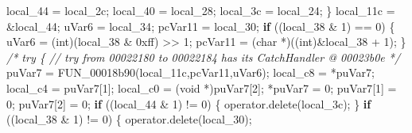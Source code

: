 \documentclass[
]{article}
\newenvironment{Shaded}{}{}
\newcommand{\BaseNTok}[1]{\textcolor[rgb]{0.25,0.63,0.44}{#1}}
\newcommand{\CommentTok}[1]{\textcolor[rgb]{0.38,0.63,0.69}{\textit{#1}}}
\newcommand{\ControlFlowTok}[1]{\textcolor[rgb]{0.00,0.44,0.13}{\textbf{#1}}}
\newcommand{\DataTypeTok}[1]{\textcolor[rgb]{0.56,0.13,0.00}{#1}}
\newcommand{\DecValTok}[1]{\textcolor[rgb]{0.25,0.63,0.44}{#1}}
\newcommand{\NormalTok}[1]{#1}
\newcommand{\OperatorTok}[1]{\textcolor[rgb]{0.40,0.40,0.40}{#1}}
\begin{document}
\begin{Shaded}
\begin{Highlighting}[]
\NormalTok{    local\_44 }\OperatorTok{=}\NormalTok{ local\_2c}\OperatorTok{;}
\NormalTok{    local\_40 }\OperatorTok{=}\NormalTok{ local\_28}\OperatorTok{;}
\NormalTok{    local\_3c }\OperatorTok{=}\NormalTok{ local\_24}\OperatorTok{;}
  \OperatorTok{\}}
\NormalTok{  local\_11c }\OperatorTok{=} \OperatorTok{\&}\NormalTok{local\_44}\OperatorTok{;}
\NormalTok{  uVar6 }\OperatorTok{=}\NormalTok{ local\_34}\OperatorTok{;}
\NormalTok{  pcVar11 }\OperatorTok{=}\NormalTok{ local\_30}\OperatorTok{;}
  \ControlFlowTok{if} \OperatorTok{((}\NormalTok{local\_38 }\OperatorTok{\&} \DecValTok{1}\OperatorTok{)} \OperatorTok{==} \DecValTok{0}\OperatorTok{)} \OperatorTok{\{}
\NormalTok{    uVar6 }\OperatorTok{=} \OperatorTok{(}\DataTypeTok{int}\OperatorTok{)(}\NormalTok{local\_38 }\OperatorTok{\&} \BaseNTok{0xff}\OperatorTok{)} \OperatorTok{\textgreater{}\textgreater{}} \DecValTok{1}\OperatorTok{;}
\NormalTok{    pcVar11 }\OperatorTok{=} \OperatorTok{(}\DataTypeTok{char} \OperatorTok{*)((}\DataTypeTok{int}\OperatorTok{)\&}\NormalTok{local\_38 }\OperatorTok{+} \DecValTok{1}\OperatorTok{);}
  \OperatorTok{\}}
                    \CommentTok{/* try \{ // try from 00022180 to 00022184 has its CatchHandler @ 00023b0e */}
\NormalTok{  puVar7 }\OperatorTok{=}\NormalTok{ FUN\_00018b90}\OperatorTok{(}\NormalTok{local\_11c}\OperatorTok{,}\NormalTok{pcVar11}\OperatorTok{,}\NormalTok{uVar6}\OperatorTok{);}
\NormalTok{  local\_c8 }\OperatorTok{=} \OperatorTok{*}\NormalTok{puVar7}\OperatorTok{;}
\NormalTok{  local\_c4 }\OperatorTok{=}\NormalTok{ puVar7}\OperatorTok{[}\DecValTok{1}\OperatorTok{];}
\NormalTok{  local\_c0 }\OperatorTok{=} \OperatorTok{(}\DataTypeTok{void} \OperatorTok{*)}\NormalTok{puVar7}\OperatorTok{[}\DecValTok{2}\OperatorTok{];}
  \OperatorTok{*}\NormalTok{puVar7 }\OperatorTok{=} \DecValTok{0}\OperatorTok{;}
\NormalTok{  puVar7}\OperatorTok{[}\DecValTok{1}\OperatorTok{]} \OperatorTok{=} \DecValTok{0}\OperatorTok{;}
\NormalTok{  puVar7}\OperatorTok{[}\DecValTok{2}\OperatorTok{]} \OperatorTok{=} \DecValTok{0}\OperatorTok{;}
  \ControlFlowTok{if} \OperatorTok{((}\NormalTok{local\_44 }\OperatorTok{\&} \DecValTok{1}\OperatorTok{)} \OperatorTok{!=} \DecValTok{0}\OperatorTok{)} \OperatorTok{\{}
\NormalTok{    operator}\OperatorTok{.}\NormalTok{delete}\OperatorTok{(}\NormalTok{local\_3c}\OperatorTok{);}
  \OperatorTok{\}}
  \ControlFlowTok{if} \OperatorTok{((}\NormalTok{local\_38 }\OperatorTok{\&} \DecValTok{1}\OperatorTok{)} \OperatorTok{!=} \DecValTok{0}\OperatorTok{)} \OperatorTok{\{}
\NormalTok{    operator}\OperatorTok{.}\NormalTok{delete}\OperatorTok{(}\NormalTok{local\_30}\OperatorTok{);}

\end{Highlighting}
\end{Shaded}
\end{document}
